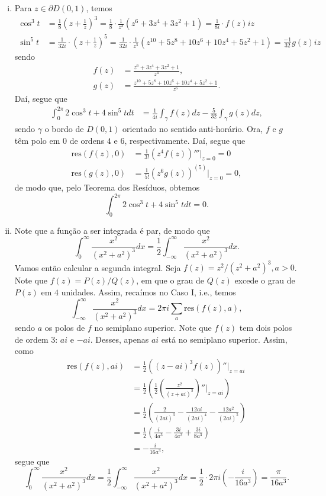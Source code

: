 \documentclass[12pt,a4paper]{article}
\newcommand{\res}{\mathrm{res}}
\begin{document}
\begin{enumerate}
\begin{enumerate}[(i)]
		\item Para $z\in\partial D(0,1)$, temos
		\begin{align*}
		\cos^3t &= \frac{1}{8}\left( z+\frac{1}{z} \right)^3 = \frac{1}{8}\cdot\frac{1}{z^3}(z^6 + 3z^4 + 3z^2 + 1) = \frac{1}{8i}\cdot f(z)iz \\
		\sin^5t &= \frac{1}{32i}\cdot\left( z+\frac{1}{z} \right)^5 = \frac{1}{32i}\cdot\frac{1}{z^5}(z^{10} + 5z^8 + 10z^6 + 10z^4 + 5z^2 + 1) = \frac{-1}{32}g(z)iz
		\end{align*}
		sendo
		\begin{align*}
		f(z) &= \frac{z^6 + 3z^4 + 3z^2 + 1}{z^4}, \\
		g(z) &= \frac{z^{10} + 5z^8 + 10z^6 + 10z^4 + 5z^2 + 1}{z^6}.
		\end{align*}
		Daí, segue que
		\begin{align*}
		\int_{0}^{2\pi}2\cos^3t + 4\sin^5tdt &= \frac{1}{4i}\int_{\gamma}f(z)dz - \frac{5}{32}\int_{\gamma}g(z)dz,
		\end{align*}
		sendo $\gamma$ o bordo de $D(0,1)$ orientado no sentido anti-horário. Ora, $f$ e $g$ têm polo em $0$ de ordens $4$ e $6$, respectivamente. Daí, segue que
		\begin{align*}
		\res(f(z),0) &= \frac{1}{3!}(z^4f(z))'''\Big|_{z=0} = 0 \\
		\res(g(z),0) &= \frac{1}{5!}(z^6g(z))^{(5)}\Big|_{z=0} = 0,
		\end{align*}
		de modo que, pelo Teorema dos Resíduos, obtemos
		$$
		\int_{0}^{2\pi}2\cos^3t + 4\sin^5tdt = 0.
		$$
		
		\item Note que a função a ser integrada é par, de modo que
		$$
		\int_{0}^{\infty}\frac{x^2}{(x^2+a^2)^3}dx = \frac{1}{2}\int_{-\infty}^{\infty}\frac{x^2}{(x^2+a^2)^3}dx.
		$$
		Vamos então calcular a segunda integral. Seja $f(z) = z^2/(z^2+a^2)^3, a>0$. Note que $f(z) = P(z)/Q(z)$, em que o grau de $Q(z)$ excede o grau de $P(z)$ em $4$ unidades. Assim, recaímos no Caso I, i.e., temos
		$$
		\int_{-\infty}^{\infty}\frac{x^2}{(x^2+a^2)^3}dx = 2\pi i\sum_a\res(f(z),a),
		$$
		sendo $a$ os polos de $f$ no semiplano superior. Note que $f(z)$ tem dois polos de ordem $3$: $ai$ e $-ai$. Desses, apenas $ai$ está no semiplano superior. Assim, como
		\begin{align*} 
		\res(f(z),ai) &= \frac{1}{2}\left( (z-ai)^3f(z) \right)''\Bigg|_{z=ai} \\ 
		&= \frac{1}{2}\left( \frac{1}{2}\left( \frac{z^2}{(z+ai)^3} \right)''\Bigg|_{z=ai}\right) \\ 
		&= \frac{1}{2}\left(\frac{2}{(2ai)^3} - \frac{12ai}{(2ai)^4} - \frac{12a^2}{(2ai)^5}\right) \\
		&= \frac{1}{2}\left(\frac{i}{4a^3} - \frac{3i}{4a^3} + \frac{3i}{8a^3}\right) \\
		&= -\frac{i}{16a^3},
		\end{align*} 
		segue que
		$$
		\int_{0}^{\infty}\frac{x^2}{(x^2+a^2)^3}dx = \frac{1}{2}\int_{-\infty}^{\infty}\frac{x^2}{(x^2+a^2)^3}dx = \frac{1}{2}\cdot 2\pi i \left( -\frac{i}{16a^3} \right) = \frac{\pi}{16a^3}.
		$$
	\end{enumerate}
	\end{enumerate}
\end{document}
